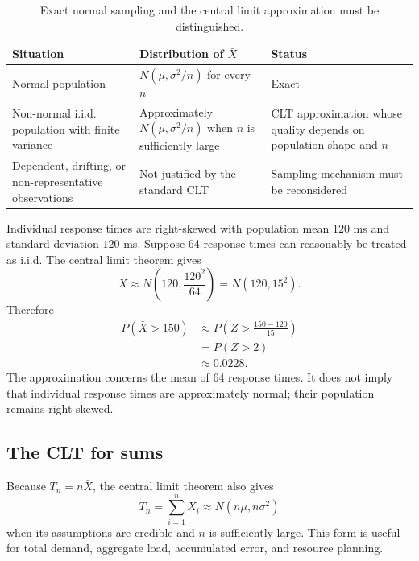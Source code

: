 \begin{table}[htbp]
\centering
\caption{Exact normal sampling and the central limit approximation must be distinguished.}
\label{tab:exact-versus-clt}
\begin{tabularx}{\textwidth}{@{}l>{\raggedright\arraybackslash}X>{\raggedright\arraybackslash}X@{}}
\toprule
Situation & Distribution of $\bar X$ & Status \\
\midrule
Normal population
& $N(\mu,\sigma^2/n)$ for every $n$
& Exact \\
Non-normal i.i.d. population with finite variance
& Approximately $N(\mu,\sigma^2/n)$ when $n$ is sufficiently large
& CLT approximation whose quality depends on population shape and $n$ \\
Dependent, drifting, or non-representative observations
& Not justified by the standard CLT
& Sampling mechanism must be reconsidered \\
\bottomrule
\end{tabularx}
\end{table}

\FloatBarrier

\begin{example}\par
Individual response times are right-skewed with population mean $120$ ms and standard deviation $120$ ms. Suppose 64 response times can reasonably be treated as i.i.d. The central limit theorem gives
\[
    \bar X\approx N\!\left(120,\frac{120^2}{64}\right)
      =N(120,15^2).
\]
Therefore
\[
\begin{aligned}
P(\bar X>150)
  &\approx P\!\left(Z>\frac{150-120}{15}\right)\\
  &=P(Z>2)\\
  &\approx0.0228.
\end{aligned}
\]
The approximation concerns the mean of 64 response times. It does not imply that individual response times are approximately normal; their population remains right-skewed.
\end{example}

\subsection{The CLT for sums}

Because $T_n=n\bar X$, the central limit theorem also gives
\[
    T_n=\sum_{i=1}^{n}X_i
      \approx N(n\mu,n\sigma^2)
\]
when its assumptions are credible and $n$ is sufficiently large. This form is useful for total demand, aggregate load, accumulated error, and resource planning.

